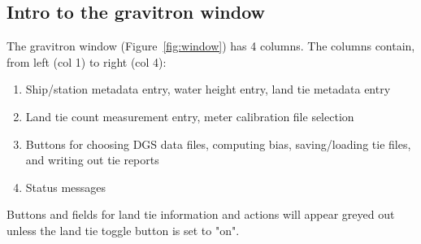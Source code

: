 \documentclass{pfpe-manual}
\begin{document}
\subsection{Intro to the gravitron window}

The gravitron window (Figure~\ref{fig:window}) has 4 columns. The columns contain, from left (col 1) to right (col 4):
\begin{enumerate}
\item Ship/station metadata entry, water height entry, land tie metadata entry
\item Land tie count measurement entry, meter calibration file selection
\item Buttons for choosing DGS data files, computing bias, saving/loading tie files, and writing out tie reports
\item Status messages
\end{enumerate}

Buttons and fields for land tie information and actions will appear greyed out unless the land tie toggle button is set to "on".
\end{document}
